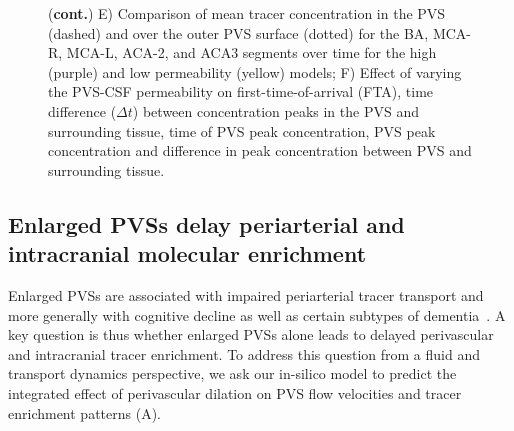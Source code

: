 \documentclass[fleqn,10pt]{wlscirep}
\begin{document}
\begin{figure}
\ContinuedFloat
\caption{(\textbf{cont.})
  E) Comparison of mean tracer concentration in the PVS (dashed) and over the
outer PVS surface (dotted) for the BA, MCA-R, MCA-L, ACA-2, and ACA3 segments over time for the high (purple) and low permeability (yellow) models;
  F) Effect of varying the PVS-CSF permeability on first-time-of-arrival (FTA), time difference ($\Delta t$) between concentration peaks in the PVS and surrounding tissue, time of PVS peak concentration, PVS peak concentration and difference in peak concentration between PVS and surrounding tissue.}
\end{figure}
  
\subsection*{Enlarged PVSs delay periarterial and intracranial molecular enrichment}

Enlarged PVSs are associated with impaired periarterial tracer
transport and more generally with cognitive decline as well as
certain subtypes of
dementia~\cite{bown2022physiology,eide2024functional}. A key
question is thus whether enlarged PVSs alone leads to delayed perivascular
and intracranial tracer enrichment. To address this question from a
fluid and transport dynamics perspective, we ask our in-silico model
to predict the integrated effect of perivascular dilation on PVS flow
velocities and tracer enrichment patterns (A).
\end{document}
